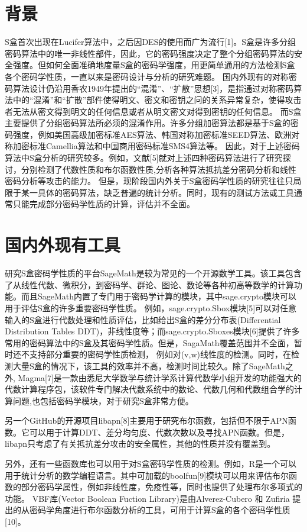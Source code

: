 \documentclass{xduugthesis}
\numberwithin{equation}{section}
\begin{document}
\section{背景}
S盒首次出现在Lucifer算法中，之后因DES的使用而广为流行[1]。S盒是许多分组密码算法中的唯一非线性部件，因此，它的密码强度决定了整个分组密码算法的安全强度。但如何全面准确地度量S盒的密码学强度，用更简单通用的方法检测S盒各个密码学性质，一直以来是密码设计与分析的研究难题。
国内外现有的对称密码算法设计仍沿用香农1949年提出的“混淆”、“扩散”思想[3]，是指通过对称密码算法中的“混淆”和“扩散”部件使得明文、密文和密钥之问的关系异常复杂，使得攻击者无法从密文得到明文的任何信息或者从明文密文对得到密钥的任何信息。
而S盒主要提供了分组密码算法所必须的混淆作用。许多分组加密算法都是基于S盒的密码强度，例如美国高级加密标准AES算法、韩国对称加密标准SEED算法、欧洲对称加密标准Camellia算法和中国商用密码标准SMS4算法等。
因此，对于上述密码算法中S盒分析的研究较多。例如，文献[5]就对上述四种密码算法进行了研究探讨，分别检测了代数性质和布尔函数性质,分析各种算法抵抗差分密码分析和线性密码分析等攻击的能力。
但是，现阶段国内外关于S盒密码学性质的研究往往只局限于某一具体的密码算法，缺乏普遍的统计分析。同时，现有的测试方法或工具通常只能完成部分密码学性质的计算，评估并不全面。\par
\section{国内外现有工具}
研究S盒密码学性质的平台SageMath是较为常见的一个开源数学工具。该工具包含了从线性代数、微积分，到密码学、群论、图论、数论等各种初高等数学的计算功能。而且SageMath内置了专门用于密码学计算的模块，其中sage.crypto模块可以用于评估S盒的许多重要密码学性质。
例如，sage.crypto.Sbox模块[5]可以对任意输入的S盒进行代数处理和性质评估，比如给出S盒的差分分布表(Differential Distribution Tables DDT)，非线性度等；而sage.crypto.Sboxes模块[6]提供了许多常用的密码算法中的S盒及其密码学性质。但是，SagaMath覆盖范围并不全面，暂时还不支持部分重要的密码学性质检测，
例如对(v,w)线性度的检测。同时，在检测大量S盒的情况下，该工具的效率并不高，检测时间比较久。除了SageMath之外, Magma[7]是一款由悉尼大学数学与统计学系计算代数学小组开发的功能强大的代数计算程序包，该软件专门解决代数系统中的数论、代数几何和代数组合学的计算问题,也包括密码学模块，对于研究S盒非常方便。\par

另一个GitHub的开源项目libapn[8]主要用于研究布尔函数，包括但不限于APN函数。它可以用于计算DDT、差分均匀度、代数次数以及寻找APN函数。但是，libapn只考虑了有关抵抗差分攻击的安全属性，其他的性质并没有覆盖到。\par
另外，还有一些函数库也可以用于对S盒密码学性质的检测。例如，R是一个可以用于统计分析的数学编程语言。其中可加载的boolfun[9]模块可以用来评估布尔函数的部分密码学属性，例如非线性度，免疫性等，同时也提供了处理布尔多项式的功能。
VBF库(Vector Boolean Fuction Library)是由Alverez-Cubero 和 Zufiria 提出的从密码学角度进行布尔函数分析的工具，可用于计算S盒的各个密码学性质[10]。\par
\end{document}
